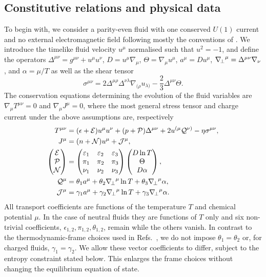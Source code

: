 \subsection{Constitutive relations and physical data}\label{sec:constitutive}
To begin with, we consider a parity-even fluid with one conserved $U(1)$
current and no external electromagnetic field following mostly the conventions of \cite{HoultKovtun}.
We introduce the timelike fluid velocity $u^\mu$ normalised such that $u^2=-1$, and define the operators $\Delta^{\mu\nu}=g^{\mu\nu}+u^\mu u^\nu$,
$D=u^\mu\nabla_\mu$, $\Theta=\nabla_\mu u^\mu$,
$a^\mu=Du^\mu$, ${\nabla_{\!\perp}}^\mu=\Delta^{\mu\nu}\nabla_\nu$, and
$\alpha=\mu/T$ as well as the shear tensor
\begin{equation}
 \sigma^{\mu\nu}=2\Delta^{\mu\rho}\Delta^{\nu\lambda}
 \nabla_{(\rho}u_{\lambda)}-\frac23\Delta^{\mu\nu}\Theta .
\end{equation}
The conservation equations determining the evolution of the fluid variables are $\nabla_\mu T^{\mu\nu}=0$ and
$\nabla_\mu J^\mu=0$, where the most general stress tensor and charge current under the above assumptions are, respectively
\begin{align}
 T^{\mu\nu}&=(\epsilon+\mathcal E)u^\mu u^\nu
 +(p+\mathcal P)\Delta^{\mu\nu}
 +2u^{(\mu}\mathcal Q^{\nu)}-\eta\sigma^{\mu\nu},\label{eq:stress}\\
 J^\mu&=(n+\mathcal N)u^\mu+\mathcal J^\mu,\label{eq:current}\\
 \begin{pmatrix}\mathcal E\\\mathcal P\\\mathcal N\end{pmatrix}
 &=\begin{pmatrix}\varepsilon_1&\varepsilon_2&\varepsilon_3\\
 \pi_1&\pi_2&\pi_3\\\nu_1&\nu_2&\nu_3\end{pmatrix}
 \begin{pmatrix}D\ln T\\\Theta\\D\alpha\end{pmatrix},\label{eq:scalars}\\
 \mathcal Q^\mu&=\theta_1a^\mu+\theta_2{\nabla_{\!\perp}}^\mu\ln T
                         +\theta_3{\nabla_{\!\perp}}^\mu\alpha,\nonumber\\
 \mathcal J^\mu&=\gamma_1a^\mu+\gamma_2{\nabla_{\!\perp}}^\mu\ln T
                         +\gamma_3{\nabla_{\!\perp}}^\mu\alpha.\label{eq:vectors}
\end{align}
All transport coefficients are functions of the temperature $T$ and chemical potential $\mu$. In the case of neutral fluids they are functions of  $T$ only and six non-trivial coefficients, $\epsilon_{1,2},\pi_{1,2},\theta_{1,2}$, remain while the others vanish. In contrast to the thermodynamic-frame choices used in
Refs.~\cite{BDN2018,Kovtun2019,BDN2019,HoultKovtun,BDN2022},
we do not impose $\theta_1=\theta_2$ or, for charged fluids,
$\gamma_1=\gamma_2$.
We allow these vector coefficients to differ, subject to the entropy
constraint stated below. This enlarges the frame choices without changing
the equilibrium equation of state.

